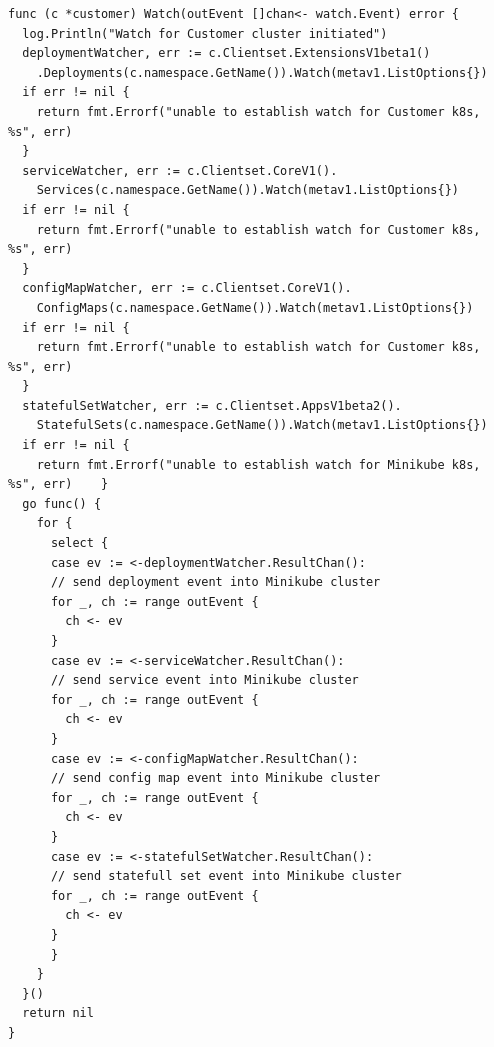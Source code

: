 \begin{lstlisting}[caption={funkce Watch, která sleduje Customer API zdroje},label=lst:watch]
func (c *customer) Watch(outEvent []chan<- watch.Event) error {
  log.Println("Watch for Customer cluster initiated")
  deploymentWatcher, err := c.Clientset.ExtensionsV1beta1()
    .Deployments(c.namespace.GetName()).Watch(metav1.ListOptions{})
  if err != nil {
    return fmt.Errorf("unable to establish watch for Customer k8s, %s", err)
  }
  serviceWatcher, err := c.Clientset.CoreV1().
    Services(c.namespace.GetName()).Watch(metav1.ListOptions{})
  if err != nil {
    return fmt.Errorf("unable to establish watch for Customer k8s, %s", err)
  }
  configMapWatcher, err := c.Clientset.CoreV1().
    ConfigMaps(c.namespace.GetName()).Watch(metav1.ListOptions{})
  if err != nil {
    return fmt.Errorf("unable to establish watch for Customer k8s, %s", err)
  }
  statefulSetWatcher, err := c.Clientset.AppsV1beta2().
    StatefulSets(c.namespace.GetName()).Watch(metav1.ListOptions{})
  if err != nil {
    return fmt.Errorf("unable to establish watch for Minikube k8s, %s", err)    }
  go func() {
    for {
      select {
      case ev := <-deploymentWatcher.ResultChan():
      // send deployment event into Minikube cluster
      for _, ch := range outEvent {
        ch <- ev
      }
      case ev := <-serviceWatcher.ResultChan():
      // send service event into Minikube cluster
      for _, ch := range outEvent {
        ch <- ev
      }
      case ev := <-configMapWatcher.ResultChan():
      // send config map event into Minikube cluster
      for _, ch := range outEvent {
        ch <- ev
      }
      case ev := <-statefulSetWatcher.ResultChan():
      // send statefull set event into Minikube cluster
      for _, ch := range outEvent {
        ch <- ev
      }
      }
    }
  }()
  return nil
}
\end{lstlisting}
